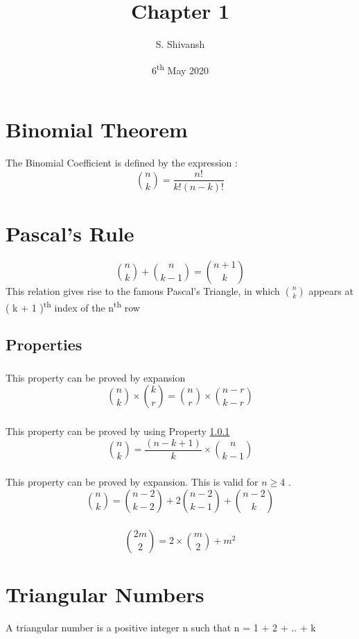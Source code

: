 \documentclass{article}
\title{ Chapter 1 }
\author{ S. Shivansh }
\date{ 6\textsuperscript{th} May 2020 }
\begin{document}
\maketitle


\section{ Binomial Theorem }
The Binomial Coefficient is defined by the expression : 
\[
    \binom{n}{k} = \frac{n!}{k!(n-k)!}
\]


\section*{ Pascal's Rule }
\[
    \binom{n}{k} + \binom{n}{k-1} = \binom{n+1}{k}
\]
This relation gives rise to the famous Pascal's Triangle, in which \( \binom{n}{k}\) appears at ( k + 1 )\textsuperscript{th} index of the n\textsuperscript{th} row

\subsection*{ Properties }
\subsubsection{}\label{1.0.1}
This property can be proved by expansion
\[
    \binom{n}{k} \times \binom{k}{r} = \binom{n}{r} \times \binom{n-r}{k-r}
\]
\subsubsection{}\label{1.0.2}
This property can be proved by using Property \ref{1.0.1}
\[
    \binom{n}{k} = \frac{(n-k+1)}{k} \times \binom{n}{k-1}
\]
\subsubsection{}\label{1.0.3}
This property can be proved by expansion. This is valid for $n\geq$4 .
\[
    \binom{n}{k} = \binom{n-2}{k-2} + 2\binom{n-2}{k-1} + \binom{n-2}{k}
\]
\subsubsection{}\label{1.0.4}
\[ \binom{2m}{2} = 2\times\binom{m}{2} + m^2\]

\section{ Triangular Numbers }
A triangular number is a positive integer n such that n = 1 + 2 + .. + k
\end{document}
